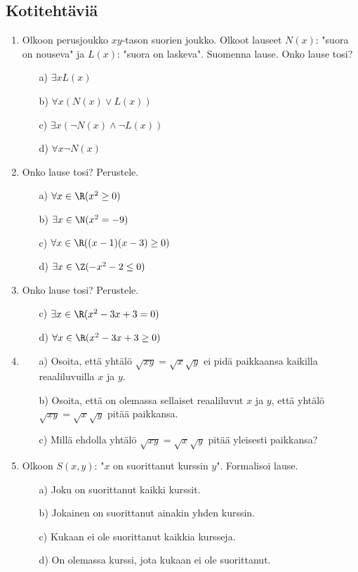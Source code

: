 \subsection*{Kotitehtäviä}

\begin{enumerate}

\item Olkoon perusjoukko $xy$-tason suorien joukko. Olkoot
lauseet $N(x)$: "suora on nouseva" ja $L(x)$: "suora on laskeva".
Suomenna lause. Onko lause tosi?
\begin{itemize}
\item[a)] $\exists x L(x)$
\item[b)] $\forall x (N(x) \lor L(x))$
\item[c)] $\exists x (\lnot N(x) \land \lnot L(x))$
\item[d)] $\forall x \lnot N(x)$
\end{itemize}

\item Onko lause tosi? Perustele.
\begin{itemize}
\item[a)] $\forall x\in\R (x^2 \ge 0)$
\item[b)] $\exists x\in\N (x^2 = -9)$
\item[c)] $\forall x\in\R ((x-1)(x-3) \ge 0)$
\item[d)] $\exists x\in\Z (-x^2 - 2 \le 0)$
\end{itemize}

\item Onko lause tosi? Perustele.
\begin{itemize}
\item[c)] $\exists x\in \R (x^2 - 3x + 3 = 0)$
\item[d)] $\forall x\in \R (x^2 - 3x + 3 \ge 0)$
\end{itemize}

\item
\begin{itemize}
\item[a)] Osoita, että yhtälö $\sqrt{xy} = \sqrt{x}\sqrt{y}$ ei
pidä paikkaansa kaikilla reaaliluvuilla $x$ ja $y$.
\item[b)] Osoita, että on olemassa sellaiset reaaliluvut $x$ ja
$y$, että yhtälö $\sqrt{xy} = \sqrt{x}\sqrt{y}$ pitää paikkansa.
\item[c)] Millä ehdolla yhtälö $\sqrt{xy} = \sqrt{x}\sqrt{y}$
pitää yleisesti paikkansa?
\end{itemize}

\item Olkoon $S(x,y)$: "$x$ on suorittanut kurssin $y$".
Formalisoi lause.
\begin{itemize}
\item[a)] Joku on suorittanut kaikki kurssit.
\item[b)] Jokainen on suorittanut ainakin yhden kurssin.
\item[c)] Kukaan ei ole suorittanut kaikkia kursseja.
\item[d)] On olemassa kurssi, jota kukaan ei ole suorittanut.
\end{itemize}


\end{enumerate}
